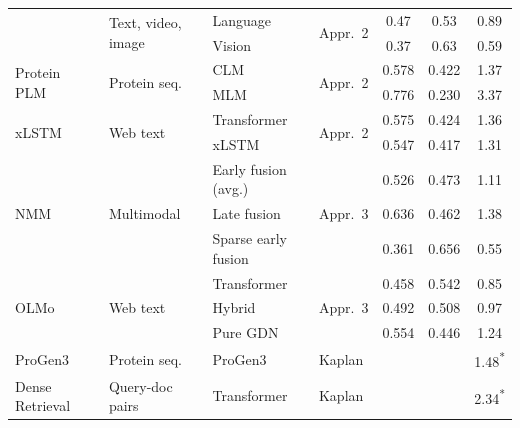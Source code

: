 \documentclass[11pt]{article}
\begin{document}
\begin{table}[H]
\begin{tabular}{llllccc}
            & \multirow{2}{*}{Text, video, image}
            & Language & \multirow{2}{*}{Appr.~2}
            & 0.47 & 0.53 & 0.89 \\
        & & Vision & & 0.37 & 0.63 & 0.59 \\
        \midrule
        \multirow{2}{*}{Protein PLM~\citep{protein_plm_scaling}}
            & \multirow{2}{*}{Protein seq.}
            & CLM & \multirow{2}{*}{Appr.~2}
            & 0.578 & 0.422 & 1.37 \\
        & & MLM & & 0.776 & 0.230 & 3.37 \\
        \midrule
        \multirow{2}{*}{xLSTM~\citep{xlstm_scaling}}
            & \multirow{2}{*}{Web text}
            & Transformer & \multirow{2}{*}{Appr.~2}
            & 0.575 & 0.424 & 1.36 \\
        & & xLSTM & & 0.547 & 0.417 & 1.31 \\
        \midrule
        \multirow{3}{*}{NMM~\citep{nmm_scaling}}
            & \multirow{3}{*}{Multimodal}
            & Early fusion (avg.) & \multirow{3}{*}{Appr.~3}
            & 0.526 & 0.473 & 1.11 \\
        & & Late fusion & & 0.636 & 0.462 & 1.38 \\
        & & Sparse early fusion & & 0.361 & 0.656 & 0.55 \\
        \midrule
        \multirow{3}{*}{OLMo~\citep{olmo_hybrid}}
            & \multirow{3}{*}{Web text}
            & Transformer & \multirow{3}{*}{Appr.~3}
            & 0.458 & 0.542 & 0.85 \\
        & & Hybrid & & 0.492 & 0.508 & 0.97 \\
        & & Pure GDN & & 0.554 & 0.446 & 1.24 \\
        \midrule
        ProGen3~\citep{progen3} & Protein seq. & ProGen3 & Kaplan
            & & & 1.48\textsuperscript{*} \\
        \midrule
        Dense Retrieval~\citep{dense_retrieval_scaling} & Query-doc pairs & Transformer & Kaplan
            & & & 2.34\textsuperscript{*} \\
        \bottomrule
    \end{tabular}
    \vspace{4pt}


\end{table}
\end{document}

